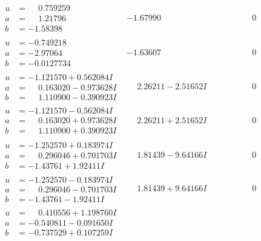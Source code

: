 \documentclass[1p]{elsarticle_modified}
\theoremstyle{definition}
\begin{document}
$$\begin{array}{c|c|c}
\begin{aligned}
u &= \phantom{-}0.759259\phantom{ +0.000000I} \\
a &= \phantom{-}1.21796\phantom{ +0.000000I} \\
b &= -1.58398\phantom{ +0.000000I}\end{aligned}
 & -1.67990\phantom{ +0.000000I} & \phantom{-0.000000 } 0 \\ \hline\begin{aligned}
u &= -0.749218\phantom{ +0.000000I} \\
a &= -2.97064\phantom{ +0.000000I} \\
b &= -0.0127734\phantom{ +0.000000I}\end{aligned}
 & -1.63607\phantom{ +0.000000I} & \phantom{-0.000000 } 0 \\ \hline\begin{aligned}
u &= -1.121570 + 0.562084 I \\
a &= \phantom{-}0.163020 - 0.973628 I \\
b &= \phantom{-}1.110900 - 0.390923 I\end{aligned}
 & \phantom{-}2.26211 - 2.51652 I & \phantom{-0.000000 } 0 \\ \hline\begin{aligned}
u &= -1.121570 - 0.562084 I \\
a &= \phantom{-}0.163020 + 0.973628 I \\
b &= \phantom{-}1.110900 + 0.390923 I\end{aligned}
 & \phantom{-}2.26211 + 2.51652 I & \phantom{-0.000000 } 0 \\ \hline\begin{aligned}
u &= -1.252570 + 0.183974 I \\
a &= \phantom{-}0.296046 + 0.701703 I \\
b &= -1.43761 + 1.92411 I\end{aligned}
 & \phantom{-}1.81439 - 9.64166 I & \phantom{-0.000000 } 0 \\ \hline\begin{aligned}
u &= -1.252570 - 0.183974 I \\
a &= \phantom{-}0.296046 - 0.701703 I \\
b &= -1.43761 - 1.92411 I\end{aligned}
 & \phantom{-}1.81439 + 9.64166 I & \phantom{-0.000000 } 0 \\ \hline\begin{aligned}
u &= \phantom{-}0.410556 + 1.198760 I \\
a &= -0.540811 - 0.091650 I \\
b &= -0.737529 + 0.107259 I\end{aligned}

\end{array}$$
\end{document}
